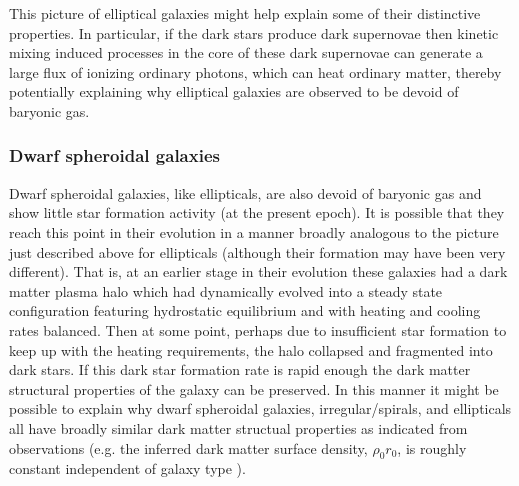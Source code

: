 \documentclass[12pt]{article}
\begin{document}
{{This picture of elliptical galaxies might help explain some of their
distinctive properties. In particular, if the dark stars produce dark
supernovae then kinetic mixing induced processes in the core of these
dark supernovae can generate a large flux of ionizing ordinary photons,
which can heat ordinary matter, thereby potentially explaining why
elliptical galaxies are observed to be devoid of baryonic gas.

\subsubsection{Dwarf spheroidal galaxies}

Dwarf spheroidal galaxies, like ellipticals, are also devoid of baryonic
gas and show little star formation activity (at the present epoch).
It is possible that they reach this point in their evolution in a manner
broadly analogous to the picture just described above for ellipticals
(although their formation may have been very different).
That is, at an earlier stage in their evolution 
these galaxies had a dark matter plasma halo which had dynamically
evolved into a steady state configuration
featuring hydrostatic equilibrium and with heating and cooling rates
balanced.
Then at some point, perhaps due to insufficient star formation to keep
up with the heating 
requirements, the halo collapsed and fragmented into
dark stars. If this dark star formation rate is rapid enough the dark
matter structural properties of the galaxy can be preserved.
In this manner it might be possible to explain why dwarf spheroidal
galaxies, irregular/spirals, and ellipticals all have 
broadly similar dark matter structual properties as indicated from
observations 
(e.g. the inferred dark matter surface density, $\rho_0 r_0$, is roughly
constant independent of galaxy type \cite{donato2}).

}}
\end{document}
